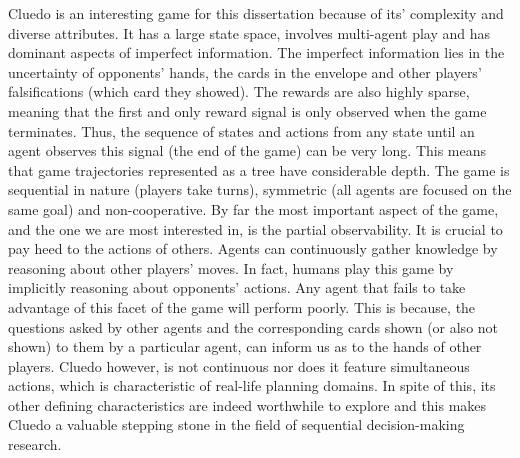 \documentclass[msc, deptreport, ai, romanprepages]{infthesis}
\begin{document}
Cluedo is an interesting game for this dissertation because of its’ complexity and diverse attributes. It has a large state space, involves multi-agent play and has dominant aspects of imperfect information. The imperfect information lies in the uncertainty of opponents’ hands, the cards in the envelope and other players’ falsifications (which card they showed). The rewards are also highly sparse, meaning that the first and only reward signal is only observed when the game terminates. Thus, the sequence of states and actions from any state until an agent observes this signal (the end of the game) can be very long. This means that game trajectories represented as a tree have considerable depth. The game is sequential in nature (players take turns), symmetric (all agents are focused on the same goal) and non-cooperative. By far the most important aspect of the game, and the one we are most interested in, is the partial observability. It is crucial to pay heed to the actions of others. Agents can continuously gather knowledge by reasoning about other players’ moves. In fact, humans play this game by implicitly reasoning about opponents’ actions. Any agent that fails to take advantage of this facet of the game will perform poorly. This is because, the questions asked by other agents and the corresponding cards shown (or also not shown) to them by a particular agent, can inform us as to the hands of other players. Cluedo however, is not continuous nor does it feature simultaneous actions, which is characteristic of real-life planning domains. In spite of this, its other defining characteristics are indeed worthwhile to explore and this makes Cluedo a valuable stepping stone in the field of sequential decision-making research.
\end{document}
